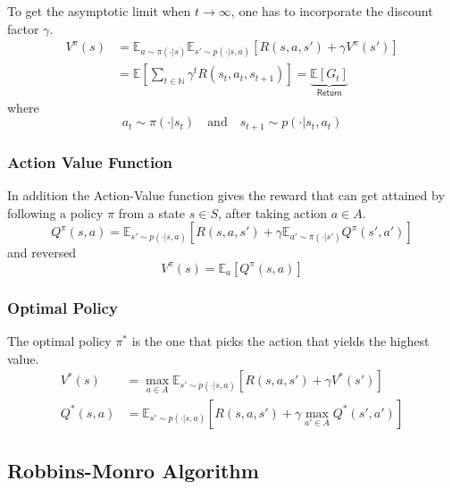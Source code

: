 \newpar{}

To get the asymptotic limit when $t \to \infty$, one has to incorporate the discount factor $\gamma$.
\begin{align*}
    V^{\pi}(s) & = \mathbb{E}_{a \sim \pi(\cdot|s)} \mathbb{E}_{s' \sim p(\cdot|s, a)} \left[R(s,a,s') + \gamma V^{\pi}(s')\right] \\
               & = \mathbb{E}\left[\sum_{t\in \mathbb{N}}\gamma^t R(s_t,a_t,s_{t+1})\right] = \underbrace{\mathbb{E}\left[G_t\right]}_{\textsf{Return}}
\end{align*}
where
\begin{equation*}
    a_t \sim \pi(\cdot | s_t) \quad \text{and} \quad s_{t+1}\sim p(\cdot | s_t,a_t)
\end{equation*}

\subsubsection{Action Value Function}
In addition the Action-Value function gives the reward that can get attained by following a policy $\pi$ from a state $s \in S$,
after taking action $a \in A$.
\begin{equation*}
    Q^\pi(s,a) = \mathbb{E}_{s' \sim p(\cdot|s,a)}\left[R(s,a,s')+\gamma \mathbb{E}_{a'\sim \pi(\cdot|s')} Q^\pi(s',a')\right]
\end{equation*}
and reversed
\begin{equation*}
    V^\pi(s) = \mathbb{E}_a \left[ Q^\pi (s,a)\right]
\end{equation*}

\subsubsection{Optimal Policy}
The optimal policy $\pi^*$ is the one that picks the action that yields the highest value.
\begin{align*}
    V^*(s)   & = \max_{a\in A}\mathbb{E}_{s'\sim p(\cdot|s,a)}\left[R(s,a,s')+\gamma V^* (s')\right]       \\
    Q^*(s,a) & = \mathbb{E}_{s'\sim p(\cdot|s,a)}\left[R(s,a,s') + \gamma \max_{a'\in A}Q^* (s',a')\right]
\end{align*}

\subsection{Robbins-Monro Algorithm}

